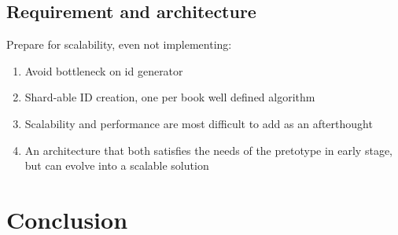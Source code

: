 \documentclass[a4paper,10pt]{book}
\begin{document}
\subsection{Requirement and architecture}
Prepare for scalability, even not implementing:
\begin{enumerate}
\item Avoid bottleneck on id generator
\item Shard-able ID creation, one per book well defined algorithm
\item Scalability and performance are most difficult to add as an afterthought
\item An architecture that both satisfies the needs of the pretotype in early stage, but can evolve
    into a scalable solution
\end{enumerate}


\section{Conclusion}
\end{document}
